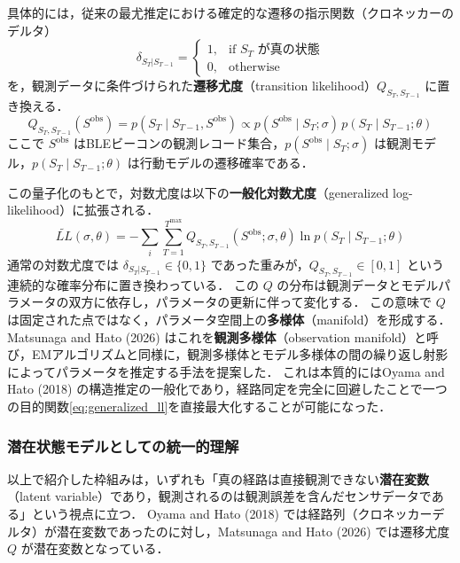 具体的には，従来の最尤推定における確定的な遷移の指示関数（クロネッカーのデルタ）
\begin{equation}\label{eq:deterministic_delta}
  \delta_{S_T | S_{T-1}} = \begin{cases} 1, & \text{if } S_T \text{ が真の状態} \\ 0, & \text{otherwise} \end{cases}
\end{equation}
を，観測データに条件づけられた\textbf{遷移尤度}（transition likelihood）$Q_{S_T, S_{T-1}}$ に置き換える．
\begin{equation}\label{eq:transition_likelihood}
  Q_{S_T, S_{T-1}}(S^{\mathrm{obs}}) = p(S_T \mid S_{T-1}, S^{\mathrm{obs}}) \propto p(S^{\mathrm{obs}} \mid S_T; \sigma) \, p(S_T \mid S_{T-1}; \theta)
\end{equation}
ここで $S^{\mathrm{obs}}$ はBLEビーコンの観測レコード集合，$p(S^{\mathrm{obs}} \mid S_T; \sigma)$ は観測モデル，$p(S_T \mid S_{T-1}; \theta)$ は行動モデルの遷移確率である．

この量子化のもとで，対数尤度は以下の\textbf{一般化対数尤度}（generalized log-likelihood）に拡張される．
\begin{equation}\label{eq:generalized_ll}
  \tilde{LL}(\sigma, \theta) = -\sum_i \sum_{T=1}^{T^{\max}} Q_{S_T, S_{T-1}}\!\left(S^{\mathrm{obs}}; \sigma, \theta\right) \ln p(S_T \mid S_{T-1}; \theta)
\end{equation}
通常の対数尤度では $\delta_{S_T | S_{T-1}} \in \{0, 1\}$ であった重みが，$Q_{S_T, S_{T-1}} \in [0, 1]$ という連続的な確率分布に置き換わっている．
この $Q$ の分布は観測データとモデルパラメータの双方に依存し，パラメータの更新に伴って変化する．
この意味で $Q$ は固定された点ではなく，パラメータ空間上の\textbf{多様体}（manifold）を形成する．
Matsunaga and Hato (2026) \cite{matsunaga2026trc} はこれを\textbf{観測多様体}（observation manifold）と呼び，EMアルゴリズムと同様に，観測多様体とモデル多様体の間の繰り返し射影によってパラメータを推定する手法を提案した．
これは本質的にはOyama and Hato (2018) \cite{Oyama2018gpseng} の構造推定の一般化であり，経路同定を完全に回避したことで一つの目的関数\eqref{eq:generalized_ll}を直接最大化することが可能になった．


\subsubsection{潜在状態モデルとしての統一的理解}\label{sssec:latent_state}

以上で紹介した枠組みは，いずれも「真の経路は直接観測できない\textbf{潜在変数}（latent variable）であり，観測されるのは観測誤差を含んだセンサデータである」という視点に立つ．
Oyama and Hato (2018) \cite{Oyama2018gpseng}では経路列（クロネッカーデルタ）が潜在変数であったのに対し，Matsunaga and Hato (2026) \cite{matsunaga2026trc} では遷移尤度 $Q$ が潜在変数となっている．

